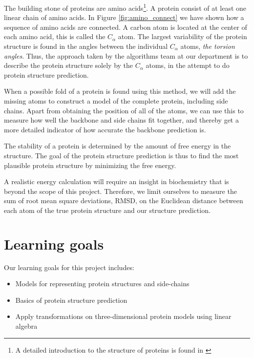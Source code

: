 \documentclass[10pt,a4paper,final,twoside,openany,article]{memoir}
\begin{document}
The building stone of proteins are amino acids\footnote{A detailed
  introduction to the structure of proteins is found in
  \cite{branden}}. A protein consist of at least one linear chain of
amino acids. In Figure \ref{fig:amino_connect} we have shown how a
sequence of amino acids are connected. A carbon atom is located at the
center of each amino acid, this is called the $C_\alpha$ atom. The
largest variability of the protein structure is found in the angles
between the individual $C_\alpha$ atoms\cite{lotan04}, \textit{the torsion
angles}. Thus, the approach taken by the algorithms team at our
department is to describe the protein structure solely by the
$C_\alpha$ atoms, in the attempt to do protein structure prediction.

When a possible fold of a protein is found using this method, we will
add the missing atoms to construct a model of the complete protein,
including side chains. Apart from obtaining the position of all of the
atoms, we can use this to measure how well the backbone and side
chains fit together, and thereby get a more detailed indicator of how
accurate the backbone prediction is.


The stability of a protein is determined by the amount of free energy
in the structure. The goal of the protein structure prediction is thus
to find the most plausible protein structure by minimizing the free
energy. 

A realistic energy calculation will require an insight in
biochemistry that is beyond the scope of this project.  Therefore, we
limit ourselves to measure the sum of root mean square deviations,
RMSD, on the Euclidean distance between each atom of the true protein
structure and our structure prediction.



\section{Learning goals}
Our learning goals for this project includes:
\begin{itemize}
\item Models for representing protein structures and side-chains
\item Basics of protein structure prediction
\item Apply transformations on three-dimensional protein models using linear algebra
\end{itemize}
\end{document}
